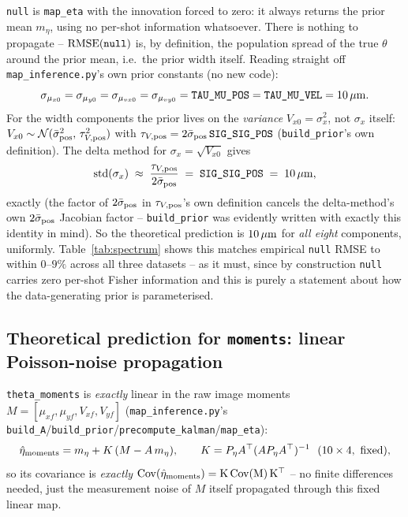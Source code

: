 \documentclass[11pt,a4paper]{article}
\newcommand{\N}{\mathcal{N}}
\newcommand{\code}[1]{\texttt{#1}}
\begin{document}
\code{null} is \code{map\_eta} with the innovation forced to zero: it always
returns the prior mean $m_\eta$, using no per-shot information whatsoever.
There is nothing to propagate -- $\rm{RMSE}(\code{null})$ is, by definition,
the population spread of the true $\theta$ around the prior mean, i.e.\ the
prior width itself. Reading straight off \code{map\_inference.py}'s own
prior constants (no new code):
\[
  \sigma_{\mu_{x0}}=\sigma_{\mu_{y0}}=\sigma_{\mu_{vx0}}=\sigma_{\mu_{vy0}}
  = \code{TAU\_MU\_POS} = \code{TAU\_MU\_VEL} = 10\,\mu{\rm m}.
\]
For the width components the prior lives on the \emph{variance}
$V_{x0}=\sigma_x^2$, not $\sigma_x$ itself:
$V_{x0}\sim\N(\bar\sigma_{\rm pos}^2,\,\tau_{V,{\rm pos}}^2)$ with
$\tau_{V,{\rm pos}}=2\bar\sigma_{\rm pos}\,\code{SIG\_SIG\_POS}$ (\code{build\_prior}'s
own definition). The delta method for $\sigma_x=\sqrt{V_{x0}}$ gives
\[
  {\rm std}(\sigma_x) \;\approx\; \frac{\tau_{V,{\rm pos}}}{2\bar\sigma_{\rm pos}}
  \;=\; \code{SIG\_SIG\_POS} \;=\; 10\,\mu{\rm m},
\]
exactly (the factor of $2\bar\sigma_{\rm pos}$ in $\tau_{V,{\rm pos}}$'s own
definition cancels the delta-method's own $2\bar\sigma_{\rm pos}$ Jacobian
factor -- \code{build\_prior} was evidently written with exactly this
identity in mind). So the theoretical prediction is $10\,\mu{\rm m}$ for
\emph{all eight} components, uniformly. Table~\ref{tab:spectrum} shows this
matches empirical \code{null} RMSE to within $0$--$9\%$ across all three
datasets -- as it must, since by construction \code{null} carries zero
per-shot Fisher information and this is purely a statement about how the
data-generating prior is parameterised.

\subsection{Theoretical prediction for \code{moments}: linear Poisson-noise propagation}
\label{sec:moments-theory}

\code{theta\_moments} is \emph{exactly} linear in the raw image moments
$M=[\mu_{xf},\mu_{yf},V_{xf},V_{yf}]$ (\code{map\_inference.py}'s
\code{build\_A}/\code{build\_prior}/\code{precompute\_kalman}/\code{map\_eta}):
\[
  \hat\eta_{\rm moments} = m_\eta + K\,(M - A\,m_\eta),\qquad
  K = P_\eta A^\top (A P_\eta A^\top)^{-1}\ \ (10\times4,\ {\rm fixed}),
\]
so its covariance is \emph{exactly} $\rm{Cov}(\hat\eta_{\rm moments}) = K\,{\rm
Cov}(M)\,K^\top$ -- no finite differences needed, just the measurement noise
of $M$ itself propagated through this fixed linear map.
\end{document}
